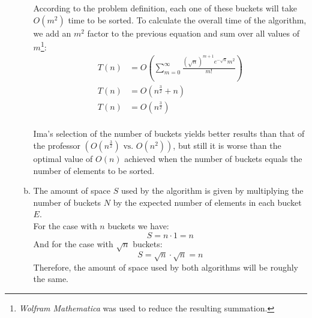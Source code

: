\documentclass{article}
\begin{document}
\begin{enumerate}[1.]
\begin{enumerate}[(a)]
        According to the problem definition, each one of these buckets will take $O(m^2)$ time to be sorted. To calculate the overall time of the algorithm, we add an $m^2$ factor to the previous equation and sum over all values of $m$\footnote{\textit{Wolfram Mathematica} was used to reduce the resulting summation.}:
        \begin{align*}
            T(n) &= O\left(\sum_{m = 0}^{\infty}\frac{(\sqrt{n})^{m+1} e^{-\sqrt{n}}m^2}{m!}\right)\\
            T(n) &= O\left(n^{\frac{3}{2}} + n\right)\\
            T(n) &= O\left(n^{\frac{3}{2}}\right)\\
        \end{align*}
        
        Ima's selection of the number of buckets yields better results than that of the professor $(O(n^{\frac{3}{2}}) \text{ vs. } O(n^2))$, but still it is worse than the optimal value of $O(n)$ achieved when the number of buckets equals the number of elements to be sorted.
        
        \item The amount of space $S$ used by the algorithm is given by multiplying the number of buckets $N$ by the expected number of elements in each bucket $E$.\\
        For the case with $n$ buckets we have:
        \begin{equation*}
            S = n \cdot 1 = n
        \end{equation*}
        And for the case with $\sqrt{n}$ buckets:
        \begin{equation*}
            S = \sqrt{n} \cdot \sqrt{n} = n
        \end{equation*}
        Therefore, the amount of space used by both algorithms will be roughly the same.
    \end{enumerate}

\end{enumerate}
\end{document}
